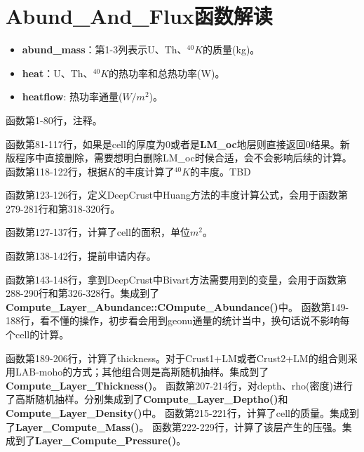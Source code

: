 	\section{Abund\_And\_Flux函数解读}
		\begin{BCBox}[title = 变量的整理]{}
			\begin{itemize}
				\item \textbf{abund\_mass}：第1-3列表示U、Th、${}^{40}K$的质量(kg)。
				\item \textbf{heat}：U、Th、${}^{40}K$的热功率和总热功率(W)。
				\item \textbf{heatflow}: 热功率通量($W/m^2$)。
			\end{itemize}
		\end{BCBox}
		\begin{GCBox}[title = 0结果直接返回]{}
			函数第1-80行，注释。\par
			函数第81-117行，如果是cell的厚度为$0$或者是\textbf{LM\_oc}地层则直接返回$0$结果。新版程序中直接删除，需要想明白删除LM\_oc时候合适，会不会影响后续的计算。
		\tcbline
			函数第118-122行，根据$K$的丰度计算了${}^{40}K$的丰度。TBD\par
		\tcbline
			函数第123-126行，定义DeepCrust中Huang方法的丰度计算公式，会用于函数第279-281行和第318-320行。\par
			函数第127-137行，计算了cell的面积，单位$m^2$。\par
			函数第138-142行，提前申请内存。\par
			函数第143-148行，拿到DeepCrust中Bivart方法需要用到的变量，会用于函数第288-290行和第326-328行。集成到了\textbf{Compute\_Layer\_Abundance::COmpute\_Abundance()}中。
		\tcbline
			函数第149-188行，{\color{red}看不懂的操作，初步看会用到geonu通量的统计当中，换句话说不影响每个cell的计算}。
		\end{GCBox}
		\begin{GCBox}[title = cell信息的计算]{}
			函数第189-206行，计算了thickness。对于Crust1+LM或者Crust2+LM的组合则采用LAB-moho的方式；其他组合则是高斯随机抽样。集成到了\textbf{Compute\_Layer\_Thickness()}。
		\tcbline
			函数第207-214行，对depth、rho(密度)进行了高斯随机抽样。分别集成到了\textbf{Compute\_Layer\_Deptho()}和\textbf{Compute\_Layer\_Density()}中。
		\tcbline
			函数第215-221行，计算了cell的质量。集成到了\textbf{Layer\_Compute\_Mass()}。
		\tcbline
			函数第222-229行，计算了该层产生的压强。集成到了\textbf{Layer\_Compute\_Pressure()}。
		\end{GCBox}
